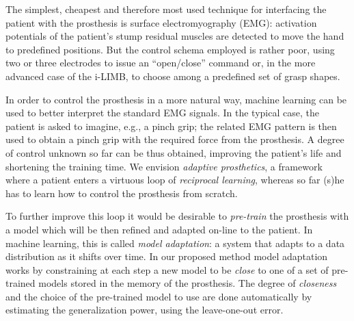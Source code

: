 The simplest, cheapest and therefore most used technique for
interfacing the patient with the prosthesis is surface
electromyography (EMG): activation potentials of the patient's stump
residual muscles are detected to move the hand to predefined
positions. But the control schema employed is rather poor, using two
or three electrodes to issue an ``open/close'' command or, in the more
advanced case of the i-LIMB, to choose among a predefined set of grasp
shapes.


In order to control the prosthesis in a more natural way, machine
learning can be used to better interpret the standard EMG signals. In
the typical case, the patient is asked to imagine, e.g., a pinch grip;
the related EMG pattern is then used to obtain a pinch grip with the
required force from the prosthesis. A degree of control unknown so far
can be thus obtained, improving the patient's life and shortening the
training time. We envision \emph{adaptive prosthetics}, a framework where
 a patient enters a virtuous loop of \emph{reciprocal learning},
whereas so far (s)he has to learn how to control the prosthesis from
scratch.


To further improve this loop it would be desirable to \emph{pre-train}
the prosthesis with a model which will be then refined and adapted
on-line to the patient. In machine learning, this is called
\emph{model adaptation}: a system that adapts to a
data distribution as 
it shifts over time. %
In our proposed method model adaptation
works by constraining at each step a new model to be \emph{close}
to one of a set of pre-trained models stored in the memory of the prosthesis.
The degree of \emph{closeness} and the choice of the pre-trained model
to use are done automatically by estimating the generalization power, using
the leave-one-out error.

